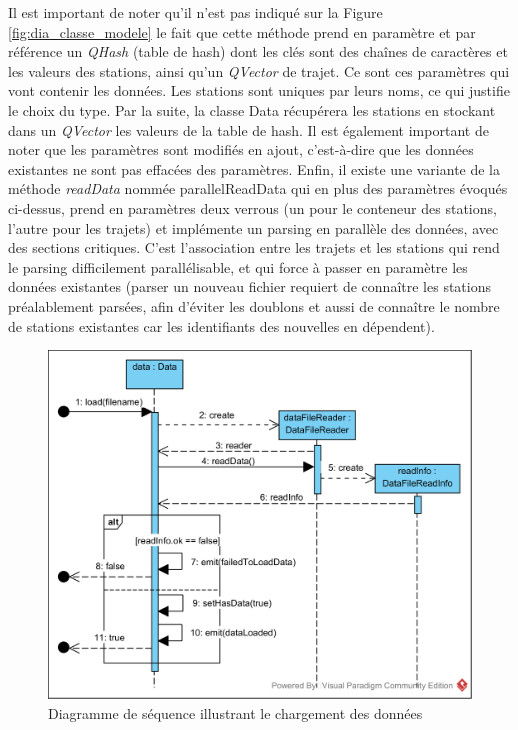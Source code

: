 \documentclass[12pt]{article}
\begin{document}
		Il est important de noter qu’il n’est pas indiqué sur la Figure \ref{fig:dia_classe_modele} le fait que cette méthode prend en paramètre et par référence un \textit{QHash} (table de hash) dont les clés sont des chaînes de caractères et les valeurs des stations, ainsi qu’un \textit{QVector} de trajet. Ce sont ces paramètres qui vont contenir les données. Les stations sont uniques par leurs noms, ce qui justifie le choix du type. Par la suite, la classe Data récupérera les stations en stockant dans un \textit{QVector} les valeurs de la table de hash. Il est également important de noter que les paramètres sont modifiés en ajout, c’est-à-dire que les données existantes ne sont pas effacées des paramètres. Enfin, il existe une variante de la méthode \textit{readData} nommée parallelReadData qui en plus des paramètres évoqués ci-dessus, prend en paramètres deux verrous (un pour le conteneur des stations, l’autre pour les trajets) et implémente un parsing en parallèle des données, avec des sections critiques. C’est l’association entre les trajets et les stations qui rend le parsing difficilement parallélisable, et qui force à passer en paramètre les données existantes (parser un nouveau fichier requiert de connaître les stations préalablement parsées, afin d’éviter les doublons et aussi de connaître le nombre de stations existantes car les identifiants des nouvelles en dépendent).\\
		
		\begin{figure}[!h]
		\begin{center}
		\includegraphics[scale=1]{dia_sequence_loadData.png}
		\caption{Diagramme de séquence illustrant le chargement des données}
		\label{fig:dia_seq_chargement_donnees}
		\end{center}
		\end{figure}
	
\end{document}
